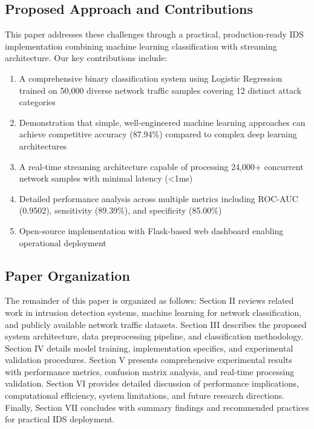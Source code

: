 \documentclass[conference]{IEEEtran}
\begin{document}
\subsection{Proposed Approach and Contributions}

This paper addresses these challenges through a practical, production-ready IDS implementation combining machine learning classification with streaming architecture. Our key contributions include:

\begin{enumerate}
    \item A comprehensive binary classification system using Logistic Regression trained on 50,000 diverse network traffic samples covering 12 distinct attack categories
    \item Demonstration that simple, well-engineered machine learning approaches can achieve competitive accuracy (87.94\%) compared to complex deep learning architectures
    \item A real-time streaming architecture capable of processing 24,000+ concurrent network samples with minimal latency (<1ms)
    \item Detailed performance analysis across multiple metrics including ROC-AUC (0.9502), sensitivity (89.39\%), and specificity (85.00\%)
    \item Open-source implementation with Flask-based web dashboard enabling operational deployment
\end{enumerate}

\subsection{Paper Organization}

The remainder of this paper is organized as follows: Section II reviews related work in intrusion detection systems, machine learning for network classification, and publicly available network traffic datasets. Section III describes the proposed system architecture, data preprocessing pipeline, and classification methodology. Section IV details model training, implementation specifics, and experimental validation procedures. Section V presents comprehensive experimental results with performance metrics, confusion matrix analysis, and real-time processing validation. Section VI provides detailed discussion of performance implications, computational efficiency, system limitations, and future research directions. Finally, Section VII concludes with summary findings and recommended practices for practical IDS deployment.
\end{document}
